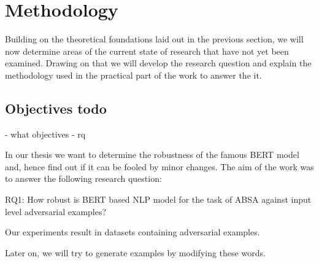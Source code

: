 
\section{Methodology}
\label{sec:methodology}

Building on the theoretical foundations laid out in the previous section, we will now determine areas of the current state of research that have not yet been examined. Drawing on that we will develop the research question and explain the methodology used in the practical part of the work to answer the it. 



\subsection{Objectives todo}
\label{sec:objectives}
- what objectives
- rq

In our thesis we want to determine the robustness of the famous BERT model and, hence find out if it can be fooled by minor changes. The aim of the work was to answer the following research question:

RQ1: How robust is BERT based NLP model for the task of ABSA against input level adversarial examples?

Our experiments result in datasets containing adversarial examples.

Later on, we will try to generate examples by modifying these words.



